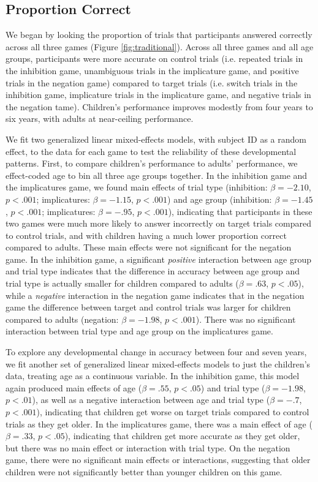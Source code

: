 \documentclass[10pt,letterpaper]{article}
\begin{document}
\subsection{Proportion Correct}

We began by looking the proportion of trials that participants answered correctly across all three games (Figure \ref{fig:traditional}).  Across all three games and all age groups, participants were more accurate on control trials (i.e. repeated trials in the inhibition game, unambiguous trials in the implicature game, and positive trials in the negation game) compared to target trials (i.e. switch trials in the inhibition game, implicature trials in the implicature game, and negative trials in the negation tame). Children's performance improves modestly from four years to six years, with adults at near-ceiling performance.  

We fit two generalized linear mixed-effects models, with subject ID as a random effect, to the data for each game to test the reliability of these developmental patterns.  First, to compare children's performance to adults' performance, we effect-coded age to bin all three age groups together.  In the inhibition game and the implicatures game, we found main effects of trial type (inhibition: $\beta = -2.10$, $p< .001$; implicatures: $\beta = -1.15$, $p< .001$) and age group (inhibition: $\beta = -1.45$, $p< .001$; implicatures: $\beta = -.95$, $p< .001$), indicating that participants in these two games were much more likely to answer incorrectly on target trials compared to control trials, and with children having a much lower proportion correct compared to adults. These main effects were not significant for the negation game.  In the inhibition game, a significant \emph{positive} interaction between age group and trial type indicates that the difference in accuracy between age group and trial type is actually smaller for children compared to adults ($\beta = .63$, $p< .05$), while a \emph{negative} interaction in the negation game indicates that in the negation game the difference between target and control trials was larger for children compared to adults (negation: $\beta = -1.98$, $p< .001$).  There was no significant interaction between trial type and age group on the implicatures game.  

To explore any developmental change in accuracy between four and seven years, we fit another set of generalized linear mixed-effects models to just the children's data, treating age as a continuous variable.  In the inhibition game, this model again produced main effects of age ($\beta = .55$, $p< .05$) and trial type ($\beta = -1.98$, $p< .01$), as well as a negative interaction between age and trial type ($\beta = -.7$, $p< .001$), indicating that children get worse on target trials compared to control trials as they get older.  In the implicatures game, there was a main effect of age ($\beta = .33$, $p< .05$), indicating that children get more accurate as they get older, but there was no main effect or interaction with trial type.  On the negation game, there were no significant main effects or interactions, suggesting that older children were not significantly better than younger children on this game.
\end{document}
